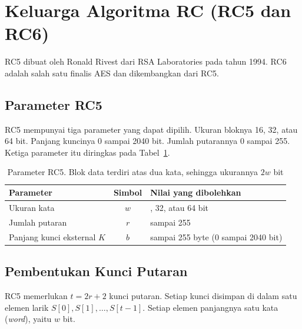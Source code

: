 \section{Keluarga Algoritma RC (RC5 dan RC6)}
\label{sec:rc5-rc6}


RC5 dibuat oleh Ronald Rivest dari RSA Laboratories pada tahun 1994. RC6 adalah
salah satu finalis AES dan dikembangkan dari RC5.

\subsection{Parameter RC5}

RC5 mempunyai tiga parameter yang dapat dipilih. Ukuran bloknya 16, 32, atau
64 bit. Panjang kuncinya 0 sampai 2040 bit. Jumlah putarannya 0 sampai 255.
Ketiga parameter itu diringkas pada Tabel~\ref{tab:parameter-rc5}.

\begin{table}[htbp]
    \centering
    \begin{tabularx}{\linewidth}{@{}l c >{\raggedright\arraybackslash}X@{}}
    \toprule
    \textbf{Parameter} & \textbf{Simbol} & \textbf{Nilai yang dibolehkan} \\
    \midrule
    Ukuran kata                    & $w$ & 16, 32, atau 64 bit \\
    Jumlah putaran                 & $r$ & 0 sampai 255 \\
    Panjang kunci eksternal $K$    & $b$ & 0 sampai 255 byte (0 sampai 2040 bit) \\
    \bottomrule
    \end{tabularx}
    \caption{Parameter RC5. Blok data terdiri atas dua kata, sehingga ukurannya
    $2w$ bit}
    \label{tab:parameter-rc5}
\end{table}

\subsection{Pembentukan Kunci Putaran}

RC5 memerlukan $t = 2r + 2$ kunci putaran. Setiap kunci disimpan di dalam satu
elemen larik $S[0], S[1], \dots, S[t-1]$. Setiap elemen panjangnya satu kata
(\textit{word}), yaitu $w$ bit.

